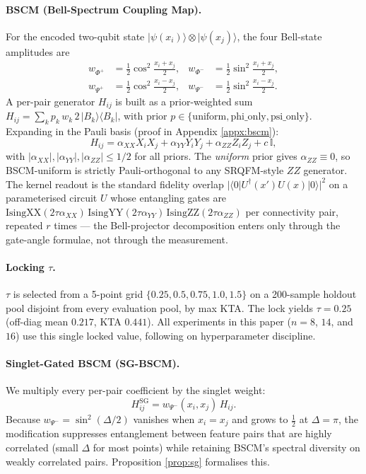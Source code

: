 \documentclass[pdflatex,sn-mathphys-num]{sn-jnl}
\theoremstyle{thmstyleone}
\theoremstyle{thmstyletwo}
\theoremstyle{thmstylethree}
\begin{document}
\paragraph{BSCM (Bell-Spectrum Coupling Map).}\label{sec:bscm}
For the encoded two-qubit state
$|\psi(x_i)\rangle\!\otimes\!|\psi(x_j)\rangle$, the four Bell-state
amplitudes are
\begin{align*}
w_{\Phi^+}&=\tfrac12\cos^2\!\tfrac{x_i+x_j}{2}, &
w_{\Phi^-}&=\tfrac12\sin^2\!\tfrac{x_i+x_j}{2},\\
w_{\Psi^+}&=\tfrac12\cos^2\!\tfrac{x_i-x_j}{2}, &
w_{\Psi^-}&=\tfrac12\sin^2\!\tfrac{x_i-x_j}{2}.
\end{align*}
A per-pair generator $H_{ij}$ is built as a prior-weighted sum
$H_{ij}=\sum_k p_k\,w_k\,2\,|B_k\rangle\!\langle B_k|$, with prior
$p\in\{\text{uniform},\text{phi\_only},\text{psi\_only}\}$. Expanding in
the Pauli basis (proof in Appendix \ref{appx:bscm}):
\begin{equation}\label{eq:pauli}
H_{ij} = \alpha_{XX}X_iX_j + \alpha_{YY}Y_iY_j + \alpha_{ZZ}Z_iZ_j + c\,\mathbb{I},
\end{equation}
with $|\alpha_{XX}|,|\alpha_{YY}|,|\alpha_{ZZ}|\le 1/2$ for all
priors. The \emph{uniform} prior gives $\alpha_{ZZ}\!\equiv\!0$, so
BSCM-uniform is strictly Pauli-orthogonal to any SRQFM-style $ZZ$
generator.
The kernel readout is the standard fidelity overlap
$|\langle 0|U^\dagger(x')U(x)|0\rangle|^2$ on a parameterised circuit
$U$ whose entangling gates are
$\mathrm{IsingXX}(2\tau\alpha_{XX})\,\mathrm{IsingYY}(2\tau\alpha_{YY})\,
\mathrm{IsingZZ}(2\tau\alpha_{ZZ})$ per connectivity pair, repeated
$r$ times --- the Bell-projector decomposition enters only through the
gate-angle formulae, not through the measurement.

\paragraph{Locking $\tau$.}
$\tau$ is selected from a 5-point grid
$\{0.25,0.5,0.75,1.0,1.5\}$ on a 200-sample holdout pool disjoint from
every evaluation pool, by max KTA. The lock yields $\tau=0.25$
(off-diag mean $0.217$, KTA $0.441$). All experiments in this paper
($n=8$, $14$, and $16$) use this single locked value, following
\cite{schnabel2025} on hyperparameter discipline.

\paragraph{Singlet-Gated BSCM (SG-BSCM).}\label{sec:sgbscm}
We multiply every per-pair coefficient by the singlet weight:
\begin{equation}\label{eq:sgbscm}
H_{ij}^{\text{SG}} = w_{\Psi^-}(x_i,x_j)\,H_{ij}.
\end{equation}
Because $w_{\Psi^-}=\sin^2(\Delta/2)$ vanishes when $x_i=x_j$ and grows
to $\tfrac12$ at $\Delta=\pi$, the modification suppresses entanglement
between feature pairs that are highly correlated (small $\Delta$ for
most points) while retaining BSCM's spectral diversity on weakly
correlated pairs. Proposition \ref{prop:sg} formalises this.
\end{document}
